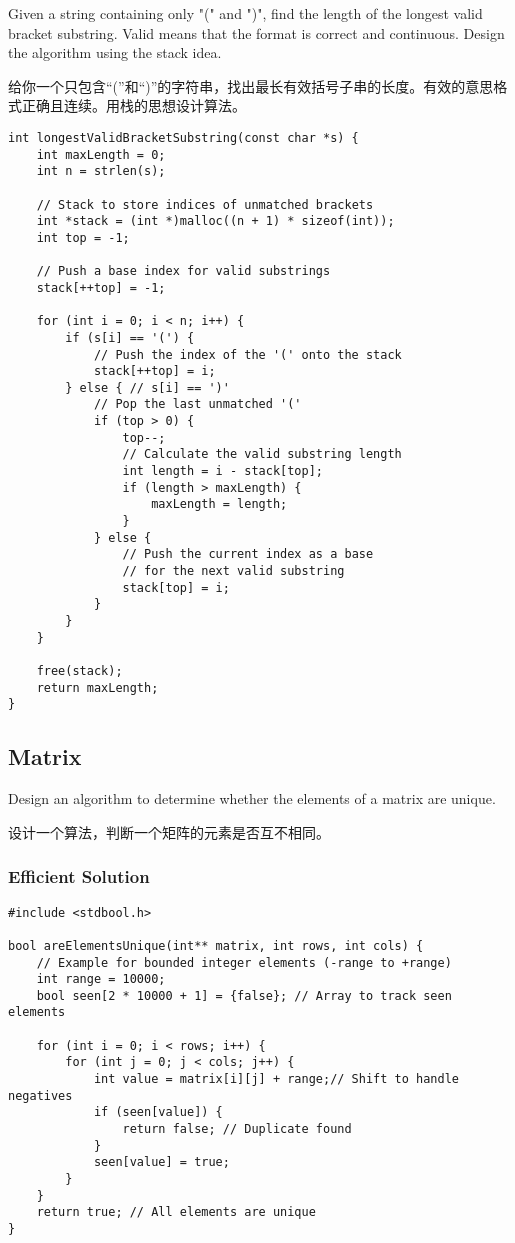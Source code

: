 \documentclass[a4paper]{article}
\begin{document}
Given a string containing only "(" and ")", find the length of the longest valid bracket substring. Valid means that the format is correct and continuous. Design the algorithm using the stack idea.

给你一个只包含“(”和“)”的字符串，找出最长有效括号子串的长度。有效的意思格式正确且连续。用栈的思想设计算法。

\begin{verbatim}
int longestValidBracketSubstring(const char *s) {
    int maxLength = 0;
    int n = strlen(s);

    // Stack to store indices of unmatched brackets
    int *stack = (int *)malloc((n + 1) * sizeof(int));
    int top = -1;

    // Push a base index for valid substrings
    stack[++top] = -1;

    for (int i = 0; i < n; i++) {
        if (s[i] == '(') {
            // Push the index of the '(' onto the stack
            stack[++top] = i;
        } else { // s[i] == ')'
            // Pop the last unmatched '('
            if (top > 0) {
                top--;
                // Calculate the valid substring length
                int length = i - stack[top];
                if (length > maxLength) {
                    maxLength = length;
                }
            } else {
                // Push the current index as a base
                // for the next valid substring
                stack[top] = i;
            }
        }
    }

    free(stack);
    return maxLength;
}
\end{verbatim}

\newpage

\subsection{Matrix}

Design an algorithm to determine whether the elements of a matrix are unique.

设计一个算法，判断一个矩阵的元素是否互不相同。

\subsubsection{Efficient Solution}
\begin{verbatim}
#include <stdbool.h>

bool areElementsUnique(int** matrix, int rows, int cols) {
	// Example for bounded integer elements (-range to +range)
    int range = 10000;
    bool seen[2 * 10000 + 1] = {false}; // Array to track seen elements
    
    for (int i = 0; i < rows; i++) {
        for (int j = 0; j < cols; j++) {
            int value = matrix[i][j] + range;// Shift to handle negatives
            if (seen[value]) {
                return false; // Duplicate found
            }
            seen[value] = true;
        }
    }
    return true; // All elements are unique
}
\end{verbatim}
\end{document}
